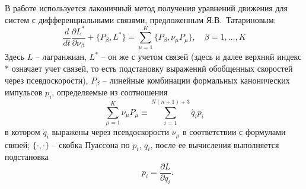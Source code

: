 В работе используется лаконичный метод получения уравнений движения для систем с дифференциальными связями, предложенным Я.В.~Татариновым:
\begin{equation}\label{Tatarinov}
    \frac{d}{dt}\frac{\partial L^{*}}{\partial \nu_\beta}  + \{P_\beta, L^{*}\} = \sum\limits_{\mu = 1}^{K}\{P_\beta, \nu_\mu P_\mu\},\quad \beta = 1,\dots, K
\end{equation}
Здесь $L$ -- лагранжиан, $L^*$ -- он же с учетом связей (здесь и далее верхний индекс $*$ означает учет связей, то есть подстановку выражений обобщенных скоростей через псевдоскорости), $P_\beta$ -- линейные комбинации формальных канонических импульсов $p_i$, определяемые из соотношения
\begin{equation}\label{eq:tatimp}
    \sum\limits_{\mu=1}^{K}\nu_\mu P_\mu \equiv \sum\limits_{i=1}^{N(n+1)+3}\dot{q_i} p_i
\end{equation}
в котором $\dot{q}_i$ выражены через псевдоскорости $\nu_\mu$ в соответствии с формулами связей; $\{\cdot, \cdot\}$ -- скобка Пуассона по $p_i$, $q_i$, после ее вычисления выполняется подстановка 
$$
    \hspace{10pt} p_i = \frac{\partial L}{\partial \dot{q}_i}.
$$

